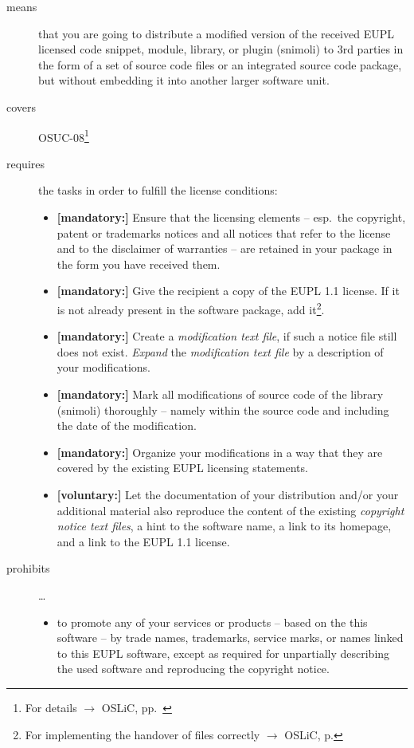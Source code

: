 \begin{description}
\item[means] that you are going to distribute a modified version of the received
EUPL licensed code snippet, module, library, or plugin (snimoli) to 3rd
parties in the form of a set of source code files or an integrated source code
package, but without embedding it into another larger software unit.
\item[covers] OSUC-08\footnote{For details $\rightarrow$ OSLiC, pp.\ \pageref{OSUC-08-DEF}}
\item[requires] the tasks in order to fulfill the license conditions:
\begin{itemize}
  
  \item \textbf{[mandatory:]} Ensure that the licensing elements -- esp.\ the
  copyright, patent or trademarks notices and all notices that refer to the
  license and to the disclaimer of warranties -- are retained in your package in
  the form you have received them.
  
  \item \textbf{[mandatory:]} Give the recipient a copy of the EUPL 1.1
  license. If it is not already present in the software package, add
  it\footnote{For implementing the handover of files correctly $\rightarrow$
  OSLiC, p. \pageref{DistributingFilesHint}}.

  \item \textbf{[mandatory:]} Create a \emph{modification text file}, if such a
  notice file still does not exist. \emph{Expand} the \emph{modification text
  file} by a description of your modifications.
  
  \item \textbf{[mandatory:]} Mark all modifications of source code of the
  library (snimoli) thoroughly -- namely within the source code and including
  the date of the modification.
   
  \item \textbf{[mandatory:]} Organize your modifications in a way that they are
  covered by the existing EUPL licensing statements.
  
  \item \textbf{[voluntary:]} Let the documentation of your distribution and/or
  your additional material  also reproduce the content of the existing
  \emph{copyright notice text files}, a hint to the software name, a link to its
  homepage, and a link to the EUPL 1.1 license.

\end{itemize}

\item[prohibits] \ldots
\begin{itemize}
  \item to promote any of your services or products -- based on the this software
  -- by trade names, trademarks, service marks, or names linked to this EUPL
  software, except as required for unpartially describing the used software and
  reproducing the copyright notice.
\end{itemize}

\end{description}



